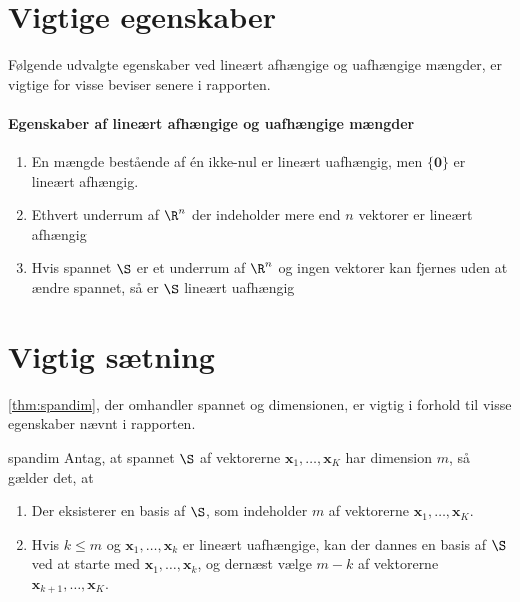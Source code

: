 \chapter{Vigtige egenskaber}
%
Følgende udvalgte egenskaber ved lineært afhængige og uafhængige mængder, er vigtige for visse beviser senere i rapporten.
\subsubsection{Egenskaber af lineært afhængige og uafhængige mængder}\label{egenskab_lin}
\begin{enumerate}
\item En mængde bestående af én ikke-nul er lineært uafhængig, men $\{\textbf{0}\}$ er lineært afhængig.
\item Ethvert underrum af $\R^n$ der indeholder mere end $n$ vektorer er lineært afhængig
\item Hvis spannet $\S$ er et underrum af $\R^n$ og ingen vektorer kan fjernes uden at ændre spannet, så er $\S$ lineært uafhængig
\end{enumerate}


\chapter{Vigtig sætning}
%
\ref{thm:spandim}, der omhandler spannet og dimensionen, er vigtig i forhold til visse egenskaber nævnt i rapporten.
\begin{thm}{}{spandim}
Antag, at spannet $\S$ af vektorerne $\mathbf{x}_1,\ldots,\mathbf{x}_K$ har dimension $m$, så gælder det, at 
\begin{enumerate}[label=(\alph*)]
    \item Der eksisterer en basis af $\S$, som indeholder $m$ af vektorerne $\mathbf{x}_1,\ldots,\mathbf{x}_K$.
    \item Hvis $k \leq m$ og $\mathbf{x}_1,\ldots,\mathbf{x}_k$ er lineært uafhængige, kan der dannes en basis af $\S$ ved at starte med $\mathbf{x}_1,\ldots,\mathbf{x}_k$, og dernæst vælge $m-k$ af vektorerne $\mathbf{x}_{k+1},\ldots,\mathbf{x}_{K}$.
\end{enumerate}
\end{thm}{}